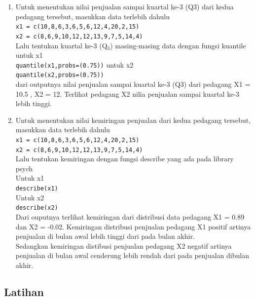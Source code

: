 \documentclass[a4paper,12pt]{article}
\begin{document}
\begin{enumerate}[label=\alph*.]
	\item Untuk menentukan nilai penjualan sampai kuartal ke-3 (Q3) dari kedua pedagang tersebut, masukkan data terlebih dahulu\\
	\texttt{x1 = c(10,8,6,3,6,5,6,12,4,20,2,15)}\\
	\texttt{x2 = c(8,6,9,10,12,12,13,9,7,5,14,4)}\\
	Lalu tentukan kuartal ke-3 (Q$_{3}$) masing-masing data dengan fungsi kuantile\\
	untuk x1\\
	\texttt{quantile(x1,probs=(0.75))}
	untuk x2\\
	\texttt{quantile(x2,probs=(0.75))}\\
	dari outputnya nilai penjualan sampai kuartal ke-3 (Q3) dari pedagang X1 = 10.5 , X2 = 12. Terlihat pedagang X2 nilia penjualan sampai kuartal ke-3 lebih tinggi.
	
	\item Untuk menentukan nilai kemiringan penjualan dari kedua pedagang tersebut, masukkan data terlebih dahulu\\
	\texttt{x1 = c(10,8,6,3,6,5,6,12,4,20,2,15)}\\
	\texttt{x2 = c(8,6,9,10,12,12,13,9,7,5,14,4)}\\
	Lalu tentukan kemiringan dengan fungsi describe yang ada pada library psych\\
	Untuk x1\\
	\texttt{describe(x1)\\}
	Untuk x2\\
	\texttt{describe(x2)\\}
	Dari ouputnya terlihat kemiringan dari distribusi data pedagang X1 = 0.89 dan X2 = -0.02. Kemiringan distribusi penjualan pedagang X1 positif artinya penjualan di bulan awal lebih tinggi dari pada bulan akhir.\\
	Sedangkan kemiringan distibusi penjualan pedagang X2 negatif artinya penjualan di bulan awal cenderung lebih rendah dari pada penjualan dibulan akhir.
	
\end{enumerate}

\subsection{Latihan}
\end{document}
